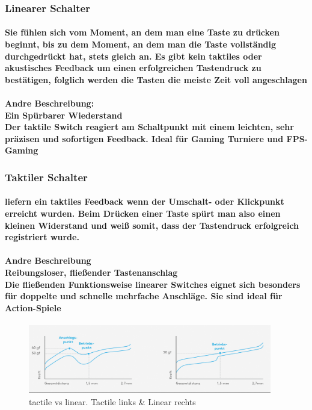 \documentclass[a4paper]{article}
\begin{document}
    \subsubsection{\color{codegreen}Linearer Schalter}
    \paragraph{\color{codegreen}Sie fühlen sich vom Moment, an dem man eine Taste zu drücken beginnt, bis zu dem Moment, an dem man
    die Taste vollständig durchgedrückt hat, stets gleich an. Es gibt kein taktiles oder akustisches Feedback um einen
    erfolgreichen Tastendruck zu bestätigen, folglich werden die Tasten die meiste Zeit voll angeschlagen}
    \paragraph{\color{codegreen} Andre Beschreibung:\\\color{red}Ein Spürbarer Wiederstand\\\color{codegreen} Der taktile Switch reagiert am Schaltpunkt mit einem leichten, sehr präzisen und sofortigen Feedback. Ideal für Gaming Turniere und FPS-Gaming}
    \subsubsection{\color{codegreen}Taktiler  Schalter}
    \paragraph{\color{codegreen}liefern ein taktiles Feedback wenn der Umschalt- oder Klickpunkt erreicht wurden. Beim Drücken einer Taste
    spürt man also einen kleinen Widerstand und weiß somit, dass der Tastendruck erfolgreich registriert wurde.}
    \paragraph{\color{codegreen} Andre Beschreibung\\\color{red} Reibungsloser, fließender Tastenanschlag\\\color{codegreen} Die fließenden Funktionsweise linearer Switches eignet sich besonders für doppelte und schnelle mehrfache Anschläge. Sie sind ideal für Action-Spiele}
    \begin{center}
        \begin{figure}[H]
            \centering
            \includegraphics[height=3cm]{media/tactile_vs_linear}
            \captionsetup{labelformat=empty}
            \caption{\color{orange} tactile vs linear. Tactile links \& Linear rechts}
            \label{fig:tactile_vs_kinear}
        \end{figure}
    \end{center}
\end{document}

